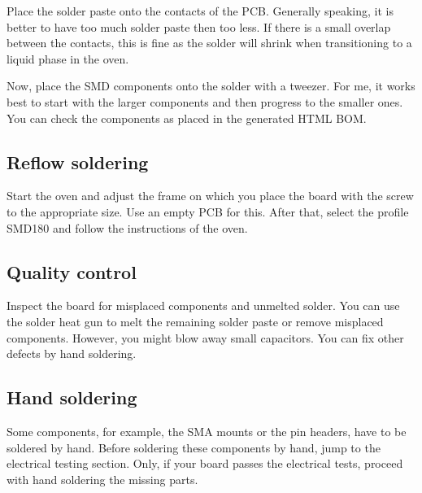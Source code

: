 Place the solder paste onto the contacts of the PCB. Generally speaking, it is better to have too much solder paste then too less. If there is a small overlap between the contacts, this is fine as the solder will shrink when transitioning to a liquid phase in the oven.

Now, place the SMD components onto the solder with a tweezer. For me, it works best to start with the larger components and then progress to the smaller ones. You can check the components as placed in the generated HTML BOM.

\subsection{Reflow soldering}

Start the oven and adjust the frame on which you place the board with the screw to the appropriate size. Use an empty PCB for this.
After that, select the profile SMD180 and follow the instructions of the oven.

\subsection{Quality control}

Inspect the board for misplaced components and unmelted solder. You can use the solder heat gun to melt the remaining solder paste or remove misplaced components. However, you might blow away small capacitors.
You can fix other defects by hand soldering.

\subsection{Hand soldering}

Some components, for example, the SMA mounts or the pin headers, have to be soldered by hand. Before soldering these components by hand, jump to the electrical testing section. Only, if your board passes the electrical tests, proceed with hand soldering the missing parts.

